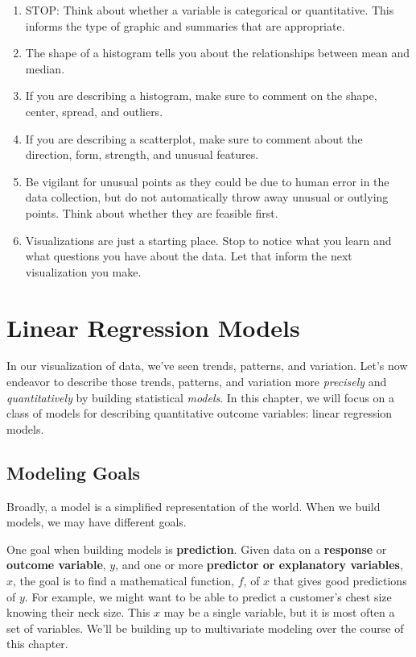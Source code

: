 \documentclass[]{book}
\begin{document}
\begin{enumerate}
\def\labelenumi{\arabic{enumi}.}
\item
  STOP: Think about whether a variable is categorical or quantitative. This informs the type of graphic and summaries that are appropriate.
\item
  The shape of a histogram tells you about the relationships between mean and median.
\item
  If you are describing a histogram, make sure to comment on the shape, center, spread, and outliers.
\item
  If you are describing a scatterplot, make sure to comment about the direction, form, strength, and unusual features.
\item
  Be vigilant for unusual points as they could be due to human error in the data collection, but do not automatically throw away unusual or outlying points. Think about whether they are feasible first.
\item
  Visualizations are just a starting place. Stop to notice what you learn and what questions you have about the data. Let that inform the next visualization you make.
\end{enumerate}

\hypertarget{linear-regression-models}{%
\chapter{Linear Regression Models}\label{linear-regression-models}}

In our visualization of data, we've seen trends, patterns, and variation. Let's now endeavor to describe those trends, patterns, and variation more \emph{precisely} and \emph{quantitatively} by building statistical \emph{models}. In this chapter, we will focus on a class of models for describing quantitative outcome variables: linear regression models.

\hypertarget{modeling-goals}{%
\section{Modeling Goals}\label{modeling-goals}}

Broadly, a model is a simplified representation of the world. When we build models, we may have different goals.

One goal when building models is \textbf{prediction}. Given data on a \textbf{response} or \textbf{outcome variable}, \(y\), and one or more \textbf{predictor or explanatory variables}, \(x\), the goal is to find a mathematical function, \(f\), of \(x\) that gives good predictions of \(y\). For example, we might want to be able to predict a customer's chest size knowing their neck size. This \(x\) may be a single variable, but it is most often a set of variables. We'll be building up to multivariate modeling over the course of this chapter.
\end{document}
